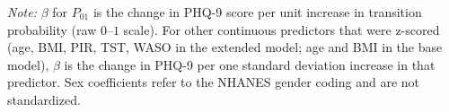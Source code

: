 \noindent\footnotesize
\textit{Note:} $\beta$ for $P_{01}$ is the change in PHQ-9 score per unit increase in transition probability (raw $0$--$1$ scale).
For other continuous predictors that were z-scored (age, BMI, PIR, TST, WASO in the extended model; age and BMI in the base model), $\beta$ is the change in PHQ-9 per one standard deviation increase in that predictor.
Sex coefficients refer to the NHANES gender coding and are not standardized.
